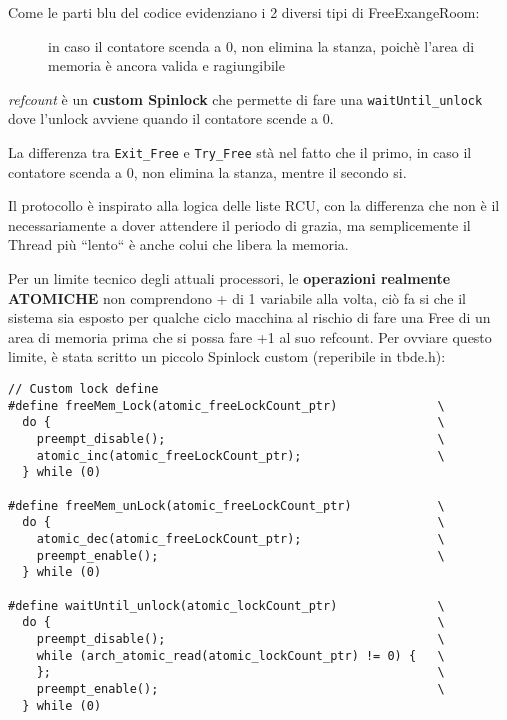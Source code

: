 Come le parti {\color{blue} blu} del codice evidenziano i 2 diversi tipi di FreeExangeRoom:
\begin{description}
 \item[\verb|Exit_Free]
    in caso il contatore scenda a 0, non elimina la stanza, poichè l'area di memoria è ancora valida e ragiungibile
 \item[\verb|Try_Free]
\end{description}
\textit{refcount} è un
\textbf{custom Spinlock} che permette di fare una \verb|waitUntil_unlock| dove l'unlock avviene quando il contatore
scende a 0.

La differenza tra \verb|Exit_Free| e \verb|Try_Free| stà nel fatto che il primo, in caso il contatore scenda a 0, non
elimina la stanza, mentre il secondo si.



Il protocollo è inspirato alla logica delle liste RCU, con la differenza che non è il \Writer necessariamente a dover
attendere il periodo di grazia, ma semplicemente il Thread più ``lento`` è anche colui che libera la memoria.

Per un limite tecnico degli attuali processori, le \textbf{operazioni realmente ATOMICHE} non comprendono + di 1
variabile alla volta, ciò fa si che il sistema sia esposto per qualche ciclo macchina al rischio di fare una Free di un
area di memoria prima che si possa fare +1 al suo refcount. Per ovviare questo limite, è stata scritto un piccolo
Spinlock custom (reperibile in tbde.h):

\begin{indentPar}{2.5cm}
\begin{small}\begin{verbatim}
// Custom lock define
#define freeMem_Lock(atomic_freeLockCount_ptr)              \
  do {                                                      \
    preempt_disable();                                      \
    atomic_inc(atomic_freeLockCount_ptr);                   \
  } while (0)

#define freeMem_unLock(atomic_freeLockCount_ptr)            \
  do {                                                      \
    atomic_dec(atomic_freeLockCount_ptr);                   \
    preempt_enable();                                       \
  } while (0)

#define waitUntil_unlock(atomic_lockCount_ptr)              \
  do {                                                      \
    preempt_disable();                                      \
    while (arch_atomic_read(atomic_lockCount_ptr) != 0) {   \
    };                                                      \
    preempt_enable();                                       \
  } while (0)
\end{verbatim}
\end{small}
\end{indentPar}

